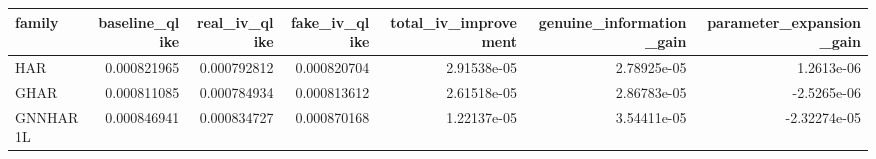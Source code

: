\begin{tabular}{lrrrrrr}
\toprule
family & baseline_qlike & real_iv_qlike & fake_iv_qlike & total_iv_improvement & genuine_information_gain & parameter_expansion_gain \\
\midrule
HAR & 0.000821965 & 0.000792812 & 0.000820704 & 2.91538e-05 & 2.78925e-05 & 1.2613e-06 \\
GHAR & 0.000811085 & 0.000784934 & 0.000813612 & 2.61518e-05 & 2.86783e-05 & -2.5265e-06 \\
GNNHAR1L & 0.000846941 & 0.000834727 & 0.000870168 & 1.22137e-05 & 3.54411e-05 & -2.32274e-05 \\
\bottomrule
\end{tabular}
